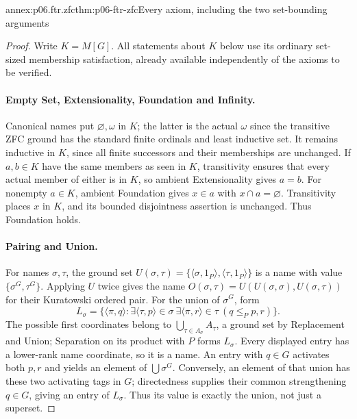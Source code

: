 \begin{annexitem}{annex:p06.ftr.zfc}{thm:p06-ftr-zfc}{Every axiom, including the two set-bounding arguments}
\begin{proof}
Write \(K=M[G]\). All statements about \(K\) below use its ordinary
set-sized membership satisfaction, already available independently of the
axioms to be verified.

\paragraph{Empty Set, Extensionality, Foundation and Infinity.}
Canonical names put \(\varnothing,\omega\) in \(K\); the latter is the
actual \(\omega\) since the transitive ZFC ground has the standard finite
ordinals and least inductive set. It remains inductive in \(K\), since
all finite successors and their memberships are unchanged. If \(a,b\in K\)
have the same members as seen in \(K\), transitivity ensures that every
actual member of either is in \(K\), so ambient Extensionality gives
\(a=b\). For nonempty \(a\in K\), ambient Foundation gives \(x\in a\)
with \(x\cap a=\varnothing\). Transitivity places \(x\) in \(K\),
and its bounded disjointness assertion is unchanged. Thus Foundation holds.

\paragraph{Pairing and Union.}
For names \(\sigma,\tau\), the ground set
\(U(\sigma,\tau)=\{\langle\sigma,1_P\rangle,
\langle\tau,1_P\rangle\}\) is a name with value
\(\{\sigma^G,\tau^G\}\). Applying \(U\) twice gives the name
\(O(\sigma,\tau)=U(U(\sigma,\sigma),U(\sigma,\tau))\) for their
Kuratowski ordered pair. For the union of \(\sigma^G\), form
\[
 L_\sigma=\{\langle\pi,q\rangle:
   \exists\langle\tau,p\rangle\in\sigma\
   \exists\langle\pi,r\rangle\in\tau\ (q\leq_P p,r)\}.
\]
The possible first coordinates belong to
\(\bigcup_{\tau\in A_\sigma}A_\tau\), a ground set by Replacement
and Union; Separation on its product with \(P\) forms \(L_\sigma\).
Every displayed entry has a lower-rank name coordinate, so it is a name.
An entry with \(q\in G\) activates both \(p,r\) and yields an element
of \(\bigcup\sigma^G\). Conversely, an element of that union has these
two activating tags in \(G\); directedness supplies their common
strengthening \(q\in G\), giving an entry of \(L_\sigma\).
Thus its value is exactly the union, not just a superset.


\end{proof}
\end{annexitem}
